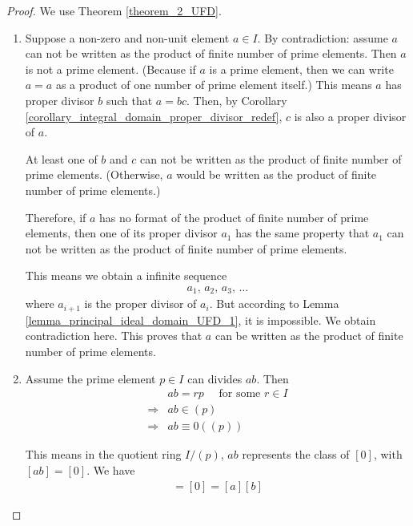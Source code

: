 \documentclass[utf8]{ctexbook}
\begin{document}
\begin{proof}
We use Theorem \ref{theorem_2_UFD}. 

\begin{enumerate}
\item{Suppose a non-zero and non-unit element $a \in I $. By contradiction: assume $a$ can not be written as the product of finite number of prime elements. Then $a$ is not a prime element. (Because if $a$ is a prime element, then we can write $a= a$ as a product of one number of prime element itself.) This means $a$ has proper divisor $b$ such that $a = bc$. Then, by Corollary \ref{corollary_integral_domain_proper_divisor_redef}, $c$ is also a proper divisor of $a$.

At least one of $b$ and $c$ can not be written as the product of finite number of prime elements. (Otherwise, $a$ would be written as the product of finite number of prime elements.)

Therefore, if $a$ has no format of the product of finite number of prime elements, then one of its proper divisor $a_1$ has the same property that $a_1$ can not be written as the product of finite number of prime elements.

This means we obtain a infinite sequence 
\begin{align*}
a_1, \, a_2, \, a_3, \, \ldots
\end{align*}
where $a_{i+1}$ is the proper divisor of $a_i$. But according to Lemma \ref{lemma_principal_ideal_domain_UFD_1}, it is impossible. We obtain contradiction here. This proves that $a$ can be written as the product of finite number of prime elements.
}
\item{Assume the prime element $p \in I$ can divides $ab$. Then
\begin{align*}
& ab = r p \quad \mbox{ for some } r \in I \\
\Longrightarrow & ab \in (p) \\
\Longrightarrow & ab \equiv 0 ( (p) )
\end{align*}

This means in the quotient ring $I/(p)$, $ab$ represents the class of $[0]$, with $[ab] = [0]$. We have
\begin{align*}
[ab] = [0] =[a][b]
\end{align*}

}
\end{enumerate}
\end{proof}
\end{document}
